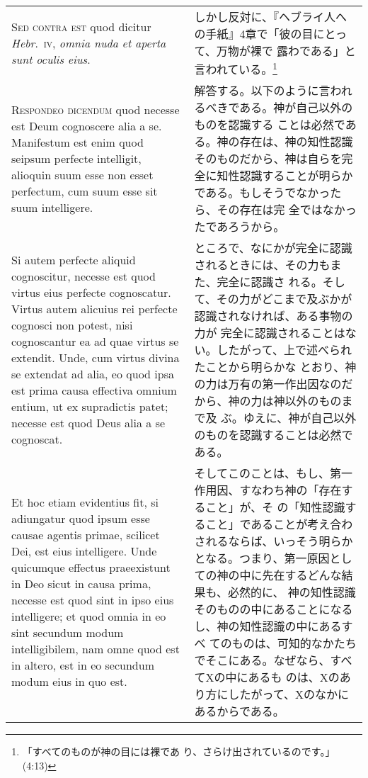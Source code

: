 \documentclass[10pt]{jsarticle} %
\begin{document}
\begin{longtable}{p{21em}p{21em}}
{\scshape Sed contra est} quod dicitur {\itshape Hebr}.~{\scshape iv},
{\itshape omnia nuda et aperta sunt oculis eius}.


&

しかし反対に、『ヘブライ人への手紙』4章で「彼の目にとって、万物が裸で
露わである」と言われている。\footnote{「すべてのものが神の目には裸であ
り、さらけ出されているのです。」(4:13)}

\\


{\scshape Respondeo dicendum} quod necesse est Deum cognoscere alia a
se. Manifestum est enim quod seipsum perfecte intelligit, alioquin
suum esse non esset perfectum, cum suum esse sit suum intelligere.


&

解答する。以下のように言われるべきである。神が自己以外のものを認識する
ことは必然である。神の存在は、神の知性認識そのものだから、神は自らを完
全に知性認識することが明らかである。もしそうでなかったら、その存在は完
全ではなかったであろうから。

\\

Si autem perfecte aliquid cognoscitur, necesse est quod virtus eius
perfecte cognoscatur.  Virtus autem alicuius rei perfecte cognosci non
potest, nisi cognoscantur ea ad quae virtus se extendit. Unde, cum
virtus divina se extendat ad alia, eo quod ipsa est prima causa
effectiva omnium entium, ut ex supradictis patet; necesse est quod
Deus alia a se cognoscat.


&

ところで、なにかが完全に認識されるときには、その力もまた、完全に認識さ
れる。そして、その力がどこまで及ぶかが認識されなければ、ある事物の力が
完全に認識されることはない。したがって、上で述べられたことから明らかな
とおり、神の力は万有の第一作出因なのだから、神の力は神以外のものまで及
ぶ。ゆえに、神が自己以外のものを認識することは必然である。


\\

Et hoc etiam evidentius fit, si adiungatur quod ipsum esse causae
agentis primae, scilicet Dei, est eius intelligere. Unde quicumque
effectus praeexistunt in Deo sicut in causa prima, necesse est quod
sint in ipso eius intelligere; et quod omnia in eo sint secundum modum
intelligibilem, nam omne quod est in altero, est in eo secundum modum
eius in quo est.

&

そしてこのことは、もし、第一作用因、すなわち神の「存在すること」が、そ
の「知性認識すること」であることが考え合わされるならば、いっそう明らか
となる。つまり、第一原因としての神の中に先在するどんな結果も、必然的に、
神の知性認識そのものの中にあることになるし、神の知性認識の中にあるすべ
てのものは、可知的なかたちでそこにある。なぜなら、すべてXの中にあるも
のは、Xのあり方にしたがって、Xのなかにあるからである。


\end{longtable}
\end{document}

